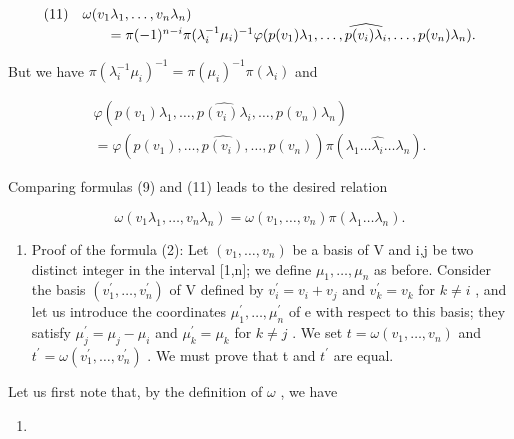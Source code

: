 \[
\begin{array}{l l} (1 1) & \omega (v _ {1} \lambda_ {1}, \ldots , v _ {n} \lambda_ {n}) \\ & \qquad = \pi (- 1) ^ {n - i} \pi (\lambda_ {i} ^ {- 1} \mu_ {i}) ^ {- 1} \varphi (p (v _ {1}) \lambda_ {1}, \ldots , \widehat {p (v _ {i}) \lambda_ {i}}, \ldots , p (v _ {n}) \lambda_ {n}). \end{array}
\]

But we have \(\pi (\lambda_i^{-1}\mu_i)^{-1} = \pi (\mu_i)^{-1}\pi (\lambda_i)\) and

\[
\begin{array}{c} \varphi (p (v _ {1}) \lambda_ {1}, \ldots , \widehat {p (v _ {i}) \lambda_ {i}}, \ldots , p (v _ {n}) \lambda_ {n}) \\ = \varphi (p (v _ {1}), \ldots , \widehat {p (v _ {i})}, \ldots , p (v _ {n})) \pi (\lambda_ {1} \ldots \widehat {\lambda_ {i}} \ldots \lambda_ {n}). \end{array}
\]

Comparing formulas (9) and (11) leads to the desired relation

\[
\omega (v _ {1} \lambda_ {1}, \ldots , v _ {n} \lambda_ {n}) = \omega (v _ {1}, \ldots , v _ {n}) \pi (\lambda_ {1} \ldots \lambda_ {n}).
\]

\begin{enumerate}
\def\labelenumi{\Alph{enumi})}
\setcounter{enumi}{3}
\tightlist
\item
  Proof of the formula (2): Let \((v_{1},\ldots,v_{n})\) be a basis of V and i,j be two distinct integer in the interval {[}1,n{]}; we define \(\mu_{1},\ldots,\mu_{n}\) as before. Consider the basis \((v_{1}^{\prime},\ldots,v_{n}^{\prime})\) of V defined by \(v_{i}^{\prime}=v_{i}+v_{j}\) and \(v_{k}^{\prime}=v_{k}\) for \(k\neq i\) , and let us introduce the coordinates \(\mu_{1}^{\prime},\ldots,\mu_{n}^{\prime}\) of e with respect to this basis; they satisfy \(\mu_{j}^{\prime}=\mu_{j}-\mu_{i}\) and \(\mu_{k}^{\prime}=\mu_{k}\) for \(k\neq j\) . We set \(t=\omega(v_{1},\ldots,v_{n})\) and \(t^{\prime}=\omega(v_{1}^{\prime},\ldots,v_{n}^{\prime})\) . We must prove that t and \(t^{\prime}\) are equal.
\end{enumerate}

Let us first note that, by the definition of \(\omega\) , we have

\begin{enumerate}
\def\labelenumi{(\arabic{enumi})}
\setcounter{enumi}{11}
\tightlist
\item
\end{enumerate}


